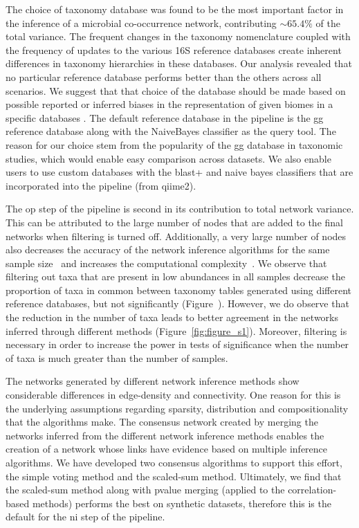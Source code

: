   The choice of taxonomy database was found to be the most important factor in the inference of a microbial co-occurrence network, contributing $\sim65.4\%$ of the total variance.
  The frequent changes in the taxonomy nomenclature coupled with the frequency of updates to the various 16S reference databases create inherent differences \cite{Balvociute2017} in taxonomy hierarchies in these databases.
  Our analysis revealed that no particular reference database performs better than the others across all scenarios. We suggest that that choice of the database should be made based on possible reported or inferred biases in the representation of given biomes in a specific databases \cite{Balvociute2017}.
  The default reference database in the pipeline is the \ac{gg} reference database along with the NaiveBayes classifier as the query tool.
  The reason for our choice stem from the popularity of the \ac{gg} database in taxonomic studies, which would enable easy comparison across datasets.
  We also enable users to use custom databases \cite{Ritari2015} with the blast+ and naive bayes classifiers that are incorporated into the pipeline (from \ac{qiime2}).

  The \ac{op} step of the pipeline is second in its contribution to total network variance.
  This can be attributed to the large number of nodes that are added to the final networks when filtering is turned off.
  Additionally, a very large number of nodes also decreases the accuracy of the network inference algorithms for the same sample size~\cite{peschelNetCoMiNetworkConstruction2020} and increases the computational complexity~\cite{tackmannRapidInferenceDirect2019}.
  We observe that filtering out taxa that are present in low abundances in all samples decrease the proportion of taxa in common between taxonomy tables generated using different reference databases, but not significantly (Figure~\cite{fig:figure_s5}).
  However, we do observe that the reduction in the number of taxa leads to better agreement in the networks inferred through different methods (Figure~\ref{fig:figure_s1}).
  Moreover, filtering is necessary in order to increase the power in tests of significance when the number of taxa is much greater than the number of samples.

  The networks generated by different network inference methods show considerable differences in edge-density and connectivity.
  One reason for this is the underlying assumptions regarding sparsity, distribution and compositionality that the algorithms make.
  The consensus network created by merging the networks inferred from the different network inference methods enables the creation of a network whose links have evidence based on multiple inference algorithms.
  We have developed two consensus algorithms to support this effort, the simple voting method and the scaled-sum method.
  Ultimately, we find that the scaled-sum method along with pvalue merging (applied to the correlation-based methods) performs the best on synthetic datasets, therefore this is the default for the \ac{ni} step of the pipeline.

